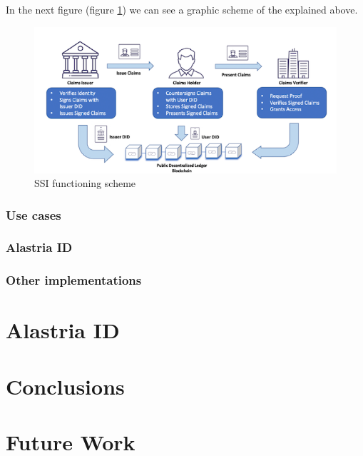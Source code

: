 \documentclass[a4paper, 12pt]{article} %
\begin{document}
                    In the next figure (figure \ref{fig:ssi-scheme}) we can see a graphic scheme of the explained above.
                    \begin{figure}[h]
                        \centering
                        \includegraphics[width=1.0\textwidth]{how-to-ssi.png}
                        \caption{SSI functioning scheme}
                        \label{fig:ssi-scheme}
                    \end{figure}

            \subsubsection{Use cases}
            \subsubsection{Alastria ID}
            \subsubsection{Other implementations}
\newpage

\section{Alastria ID}

\newpage
\section{Conclusions}

\newpage
\section{Future Work}

\newpage
\printbibliography[heading=bibnumbered] %
\end{document}
